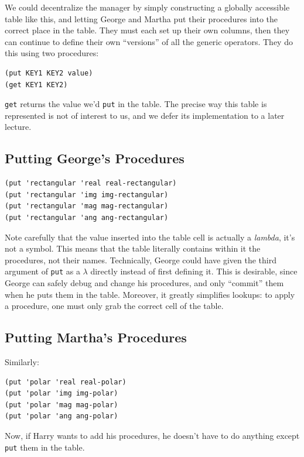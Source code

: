 \documentclass[9pt]{report}
\begin{document}
We could decentralize the manager by simply constructing a globally
accessible table like this, and letting George and Martha put their
procedures into the correct place in the table. They must each set
up their own columns, then they can continue to define their own
``versions'' of all the generic operators. They do this using two
procedures:

\begin{verbatim}
(put KEY1 KEY2 value)
(get KEY1 KEY2)
\end{verbatim}

\texttt{get} returns the value we'd \texttt{put} in the table. The precise way
this table is represented is not of interest to us, and we defer
its implementation to a later lecture.

\subsection{Putting George's Procedures}
\label{sec:org0b45541}

\begin{verbatim}
(put 'rectangular 'real real-rectangular)
(put 'rectangular 'img img-rectangular)
(put 'rectangular 'mag mag-rectangular)
(put 'rectangular 'ang ang-rectangular)
\end{verbatim}

Note carefully that the value inserted into the table cell is
actually a \emph{lambda}, it's not a symbol. This means that the table
literally contains within it the procedures, not their names.
Technically, George could have given the third argument of \texttt{put}
as a \(\lambda\) directly instead of first defining it. This is
desirable, since George can safely debug and change his
procedures, and only ``commit'' them when he puts them in the table.
Moreover, it greatly simplifies lookups: to apply a procedure, one
must only grab the correct cell of the table.


\subsection{Putting Martha's Procedures}
\label{sec:org96d9804}
Similarly:
\begin{verbatim}
(put 'polar 'real real-polar)
(put 'polar 'img img-polar)
(put 'polar 'mag mag-polar)
(put 'polar 'ang ang-polar)
\end{verbatim}

Now, if Harry wants to add his procedures, he doesn't have to do
anything except \texttt{put} them in the table.
\end{document}
